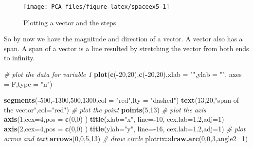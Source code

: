 \documentclass[
]{book}
\newenvironment{Shaded}{\begin{snugshade}}{\end{snugshade}}
\newcommand{\CommentTok}[1]{\textcolor[rgb]{0.56,0.35,0.01}{\textit{#1}}}
\newcommand{\DataTypeTok}[1]{\textcolor[rgb]{0.13,0.29,0.53}{#1}}
\newcommand{\DecValTok}[1]{\textcolor[rgb]{0.00,0.00,0.81}{#1}}
\newcommand{\FloatTok}[1]{\textcolor[rgb]{0.00,0.00,0.81}{#1}}
\newcommand{\KeywordTok}[1]{\textcolor[rgb]{0.13,0.29,0.53}{\textbf{#1}}}
\newcommand{\NormalTok}[1]{#1}
\newcommand{\OperatorTok}[1]{\textcolor[rgb]{0.81,0.36,0.00}{\textbf{#1}}}
\newcommand{\StringTok}[1]{\textcolor[rgb]{0.31,0.60,0.02}{#1}}
\theoremstyle{definition}
\theoremstyle{definition}
\theoremstyle{definition}
\theoremstyle{remark}
\begin{document}
\begin{figure}

{\centering \texttt{[image: PCA\_files/figure-latex/spaceex5-1]} 

}

\caption{Plotting a vector and the steps}\label{fig:spaceex5}
\end{figure}

So by now we have the magnitude and direction of a vector. A vector also has a span. A span of a vector is a line resulted by stretching the vector from both ends to infinity.

\begin{Shaded}
\begin{Highlighting}[]
\CommentTok{# plot the data for variable 1}
\KeywordTok{plot}\NormalTok{(}\KeywordTok{c}\NormalTok{(}\OperatorTok{-}\DecValTok{20}\NormalTok{,}\DecValTok{20}\NormalTok{),}\KeywordTok{c}\NormalTok{(}\OperatorTok{-}\DecValTok{20}\NormalTok{,}\DecValTok{20}\NormalTok{),}\DataTypeTok{xlab =} \StringTok{""}\NormalTok{,}\DataTypeTok{ylab =} \StringTok{""}\NormalTok{,}
 \DataTypeTok{axes =}\NormalTok{ F,}\DataTypeTok{type =} \StringTok{"n"}\NormalTok{)}

\KeywordTok{segments}\NormalTok{(}\OperatorTok{-}\DecValTok{500}\NormalTok{,}\OperatorTok{-}\DecValTok{1300}\NormalTok{,}\DecValTok{500}\NormalTok{,}\DecValTok{1300}\NormalTok{,}\DataTypeTok{col =} \StringTok{"red"}\NormalTok{,}\DataTypeTok{lty =} \StringTok{"dashed"}\NormalTok{)}
\KeywordTok{text}\NormalTok{(}\DecValTok{13}\NormalTok{,}\DecValTok{20}\NormalTok{,}\StringTok{"span of the vector"}\NormalTok{,}\DataTypeTok{col=}\StringTok{"red"}\NormalTok{)}
\CommentTok{# plot the point}
\KeywordTok{points}\NormalTok{(}\DecValTok{5}\NormalTok{,}\DecValTok{13}\NormalTok{)}
\CommentTok{# plot the axis}
\KeywordTok{axis}\NormalTok{(}\DecValTok{1}\NormalTok{,}\DataTypeTok{cex=}\DecValTok{4}\NormalTok{,}\DataTypeTok{pos =} \KeywordTok{c}\NormalTok{(}\DecValTok{0}\NormalTok{,}\DecValTok{0}\NormalTok{) )}
\KeywordTok{title}\NormalTok{(}\DataTypeTok{xlab=}\StringTok{"x"}\NormalTok{, }\DataTypeTok{line=}\OperatorTok{-}\DecValTok{10}\NormalTok{, }\DataTypeTok{cex.lab=}\FloatTok{1.2}\NormalTok{,}\DataTypeTok{adj=}\DecValTok{1}\NormalTok{)}
\KeywordTok{axis}\NormalTok{(}\DecValTok{2}\NormalTok{,}\DataTypeTok{cex=}\DecValTok{4}\NormalTok{,}\DataTypeTok{pos =} \KeywordTok{c}\NormalTok{(}\DecValTok{0}\NormalTok{,}\DecValTok{0}\NormalTok{) )}
\KeywordTok{title}\NormalTok{(}\DataTypeTok{ylab=}\StringTok{"y"}\NormalTok{, }\DataTypeTok{line=}\OperatorTok{-}\DecValTok{16}\NormalTok{, }\DataTypeTok{cex.lab=}\FloatTok{1.2}\NormalTok{,}\DataTypeTok{adj=}\DecValTok{1}\NormalTok{)}
\CommentTok{# plot arrow and text}
\KeywordTok{arrows}\NormalTok{(}\DecValTok{0}\NormalTok{,}\DecValTok{0}\NormalTok{,}\DecValTok{5}\NormalTok{,}\DecValTok{13}\NormalTok{)}
\CommentTok{# draw circle}
\NormalTok{plotrix}\OperatorTok{::}\KeywordTok{draw.arc}\NormalTok{(}\DecValTok{0}\NormalTok{,}\DecValTok{0}\NormalTok{,}\DecValTok{3}\NormalTok{,}\DataTypeTok{angle2=}\DecValTok{1}\NormalTok{)}


\end{Highlighting}
\end{Shaded}
\end{document}
